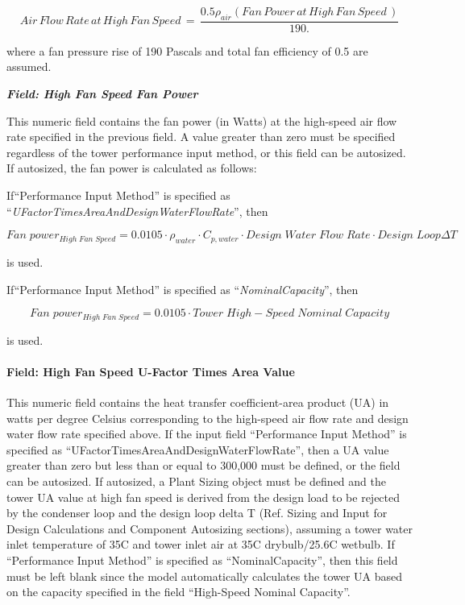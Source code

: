 \begin{equation}
Air\,Flow\,Rate\,at\,High\,Fan\,Speed\, = \,\frac{{0.5{\rho_{air}}(Fan\,Power\,at\,High\,Fan\,Speed\,)}}{{190.}}
\end{equation}

where a fan pressure rise of 190 Pascals and total fan efficiency of 0.5 are assumed.

\textbf{\emph{Field: High Fan Speed Fan Power}}

This numeric field contains the fan power (in Watts) at the high-speed air flow rate specified in the previous field. A value greater than zero must be specified regardless of the tower performance input method, or this field can be autosized. If autosized, the fan power is calculated as follows:

If``Performance Input Method'' is specified as ``\emph{UFactorTimesAreaAndDesignWaterFlowRate}'', then

\begin{equation}
Fan\;powe{r_{High\;Fan\;Speed}} = 0.0105\cdot {\rho_{water}}\cdot {C_{p,water}}\cdot Design\;Water\;Flow\;Rate\cdot Design\;Loop\Delta T
\end{equation}

is used.

If``Performance Input Method'' is specified as ``\emph{NominalCapacity}'', then

\begin{equation}
Fan\;powe{r_{High\;Fan\;Speed}} = 0.0105\cdot Tower\;High - Speed\;Nominal\;Capacity
\end{equation}

is used.

\paragraph{Field: High Fan Speed U-Factor Times Area Value}\label{field-high-fan-speed-u-factor-times-area-value}

This numeric field contains the heat transfer coefficient-area product (UA) in watts per degree Celsius corresponding to the high-speed air flow rate and design water flow rate specified above. If the input field ``Performance Input Method'' is specified as ``UFactorTimesAreaAndDesignWaterFlowRate'', then a UA value greater than zero but less than or equal to 300,000 must be defined, or the field can be autosized. If autosized, a Plant Sizing object must be defined and the tower UA value at high fan speed is derived from the design load to be rejected by the condenser loop and the design loop delta T (Ref. Sizing and Input for Design Calculations and Component Autosizing sections), assuming a tower water inlet temperature of 35C and tower inlet air at 35C drybulb/25.6C wetbulb. If ``Performance Input Method'' is specified as ``NominalCapacity'', then this field must be left blank since the model automatically calculates the tower UA based on the capacity specified in the field ``High-Speed Nominal Capacity''.


